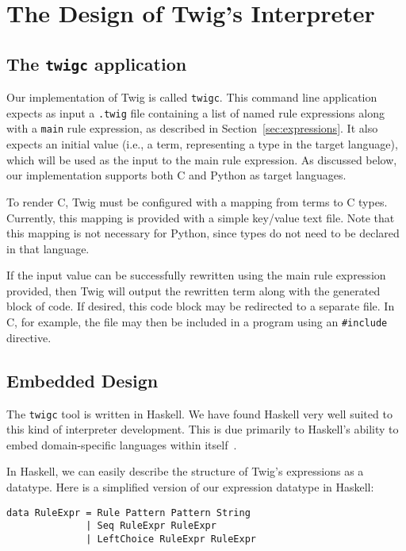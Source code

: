 
\chapter{The Design of Twig's Interpreter}
\label{ch:impl}

\section{The \texttt{twigc} application}
\label{sec:impl:twigc}

Our implementation of Twig is called \texttt{twigc}. This command
line application expects as input a \texttt{.twig} file containing
a list of named rule expressions along with a \texttt{main} rule
expression, as described in Section~\ref{sec:expressions}. It also
expects an initial value (i.e., a term, representing a type in the
target language), which will be used as the input to the main rule
expression. As discussed below, our implementation supports both C
and Python as target languages.

To render C, Twig must be configured with a mapping from terms to
C types. Currently, this mapping is provided with a simple
key/value text file. Note that this mapping is not necessary for
Python, since types do not need to be declared in that language.

If the input value can be successfully rewritten using the main
rule expression provided, then Twig will output the rewritten term
along with the generated block of code. If desired, this code
block may be redirected to a separate file. In C, for example, the
file may then be included in a program using an \texttt{\#include}
directive.

\section{Embedded Design}
\label{sec:impl:design}

The \texttt{twigc} tool is written in Haskell. We have found
Haskell very well suited to this kind of interpreter development.
This is due primarily to Haskell's ability to embed
domain-specific languages within itself~\cite{embedded-dsl}.

In Haskell, we can easily describe the structure of Twig's
expressions as a datatype. Here is a simplified version of our
expression datatype in Haskell:

\begin{verbatim}
data RuleExpr = Rule Pattern Pattern String
              | Seq RuleExpr RuleExpr
              | LeftChoice RuleExpr RuleExpr
\end{verbatim}

